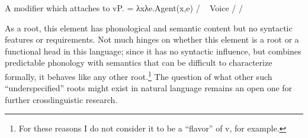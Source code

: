 \begin{exe}
\begin{xlist}
\begin{exe}
\begin{xlist}
\begin{exe}
\begin{xlist}
\begin{exe}
\begin{exe}
\begin{xlist}
\begin{exe}
\begin{xlist}
\begin{exe}
\begin{xlist}
\begin{exe}
\begin{xlist}
\begin{exe}
\begin{xlist}
\begin{exe}
\begin{xlist}
\begin{exe}
\begin{xlist}
\begin{exe}
\begin{xlist}
\begin{exe}
\begin{xlist}
\begin{exe}
\begin{xlist}
\begin{exe}
\begin{xlist}
\begin{exe}
\begin{xlist}
\begin{exe}
\begin{exe}
\begin{xlist}
\begin{exe}
\begin{xlist}
\begin{exe}
\begin{xlist}
\begin{exe}
\begin{xlist}
{\begin{exe}
\begin{xlist}
\begin{exe}
\begin{xlist}
\begin{exe}
\begin{xlist}
\begin{exe}
\begin{xlist}
\begin{xlist}
\begin{xlist}
\begin{exe}
\begin{xlist}
\begin{xlist}
\begin{xlist}
\begin{exe}
\begin{exe}
\begin{xlist}
\begin{exe}
\begin{xlist}
\begin{exe}
\begin{xlist}
\begin{exe}
\begin{xlist}
\begin{exe}
\begin{xlist}
\begin{exe}
\begin{xlist}
\begin{exe}
\begin{exe}
\begin{xlist}
\begin{xlist}
\begin{exe}
\begin{xlist}
\begin{exe}
\begin{xlist}
\begin{exe}
\begin{xlist}
\begin{exe}
\begin{xlist}
\begin{exe}
 \begin{xlist} 
 	\ex   A modifier which attaches to vP. 
 	\ex   {} = λxλe.Agent(x,e) / \trace~\va 
 	\ex   Voice {\lra} {\tpie} / {\trace} {\va} 
 	\ex   {\vz} {\lra} {\thit} / {\trace} {\va} 
 \z
\z 

As a root, this element has phonological and semantic content but no syntactic features or requirements. Not much hinges on whether this element is a root or a functional head in this language; since it has no syntactic influence, but combines predictable phonology with semantics that can be difficult to characterize formally, it behaves like any other root.\footnote{For these reasons I do not consider it to be a ``flavor'' of v, for example.} The question of what other such ``underspecified'' roots might exist in natural language remains an open one for further crosslinguistic research.


\end{xlist}
\end{exe}
\end{xlist}
\end{exe}
\end{xlist}
\end{exe}
\end{xlist}
\end{exe}
\end{xlist}
\end{exe}
\end{xlist}
\end{xlist}
\end{exe}
\end{exe}
\end{xlist}
\end{exe}
\end{xlist}
\end{exe}
\end{xlist}
\end{exe}
\end{xlist}
\end{exe}
\end{xlist}
\end{exe}
\end{xlist}
\end{exe}
\end{exe}
\end{xlist}
\end{xlist}
\end{xlist}
\end{exe}
\end{xlist}
\end{xlist}
\end{xlist}
\end{exe}
\end{xlist}
\end{exe}
\end{xlist}
\end{exe}
\end{xlist}
\end{exe}}
\end{xlist}
\end{exe}
\end{xlist}
\end{exe}
\end{xlist}
\end{exe}
\end{xlist}
\end{exe}
\end{exe}
\end{xlist}
\end{exe}
\end{xlist}
\end{exe}
\end{xlist}
\end{exe}
\end{xlist}
\end{exe}
\end{xlist}
\end{exe}
\end{xlist}
\end{exe}
\end{xlist}
\end{exe}
\end{xlist}
\end{exe}
\end{xlist}
\end{exe}
\end{xlist}
\end{exe}
\end{xlist}
\end{exe}
\end{xlist}
\end{exe}
\end{exe}
\end{xlist}
\end{exe}
\end{xlist}
\end{exe}
\end{xlist}
\end{exe}
